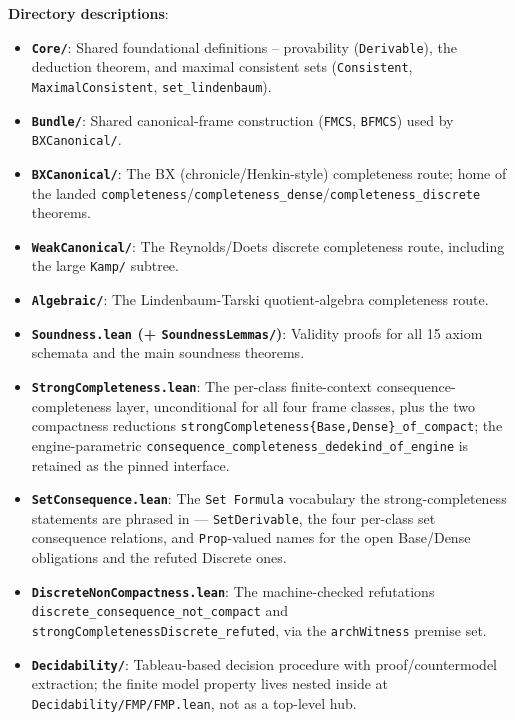 \documentclass[../BimodalReference.tex]{subfiles}
\begin{document}
\noindent
\textbf{Directory descriptions}:
\begin{itemize}
  \item \textbf{\texttt{Core/}}: Shared foundational definitions -- provability (\texttt{Derivable}), the deduction theorem, and maximal consistent sets (\texttt{Consistent}, \texttt{MaximalConsistent}, \texttt{set\_lindenbaum}).
  \item \textbf{\texttt{Bundle/}}: Shared canonical-frame construction (\texttt{FMCS}, \texttt{BFMCS}) used by \texttt{BXCanonical/}.
  \item \textbf{\texttt{BXCanonical/}}: The BX (chronicle/Henkin-style) completeness route; home of the landed \texttt{completeness}/\texttt{completeness\_dense}/\texttt{completeness\_discrete} theorems.
  \item \textbf{\texttt{WeakCanonical/}}: The Reynolds/Doets discrete completeness route, including the large \texttt{Kamp/} subtree.
  \item \textbf{\texttt{Algebraic/}}: The Lindenbaum-Tarski quotient-algebra completeness route.
  \item \textbf{\texttt{Soundness.lean} (+ \texttt{SoundnessLemmas/})}: Validity proofs for all 15 axiom schemata and the main soundness theorems.
  \item \textbf{\texttt{StrongCompleteness.lean}}: The per-class finite-context consequence-completeness layer, unconditional for all four frame classes, plus the two compactness reductions \texttt{strongCompleteness\{Base,Dense\}\_of\_compact}; the engine-parametric \texttt{consequence\_completeness\_dedekind\_of\_engine} is retained as the pinned interface.
\item \textbf{\texttt{SetConsequence.lean}}: The \texttt{Set Formula} vocabulary the strong-completeness statements are phrased in --- \texttt{SetDerivable}, the four per-class set consequence relations, and \texttt{Prop}-valued names for the open Base/Dense obligations and the refuted Discrete ones.
\item \textbf{\texttt{DiscreteNonCompactness.lean}}: The machine-checked refutations \texttt{discrete\_consequence\_not\_compact} and \texttt{strongCompletenessDiscrete\_refuted}, via the \texttt{archWitness} premise set.
  \item \textbf{\texttt{Decidability/}}: Tableau-based decision procedure with proof/countermodel extraction; the finite model property lives nested inside at \texttt{Decidability/FMP/FMP.lean}, not as a top-level hub.
\end{itemize}
\end{document}
